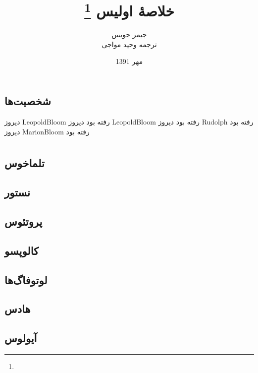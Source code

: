 \documentclass[12pt,onecolumn,a4paper]{book}
\begin{document}
    \title{خلاصۀ اولیس \footnote{}}
    \author{جیمز جویس\\
    ترجمه وحید مواجی
    }
    \date{مهر 1391}
    \frontmatter                            %
    \maketitle                              %
    \tableofcontents                        %
    \mainmatter


    \part{}
    \chapter{شخصیت‌ها}
    دیروز \gls{LeopoldBloom} رفته بود
    دیروز \gls{LeopoldBloom} رفته بود
    دیروز \gls{Rudolph} رفته بود
    دیروز \gls{MarionBloom} رفته بود

    \part{}
    \chapter{تلماخوس}
    \chapter{نستور}
    \chapter{پروتئوس}
    \chapter{کالوپسو}
    \chapter{لوتوفاگ‌ها}
    \chapter{هادس}
    \chapter{آیولوس}
\end{document}
